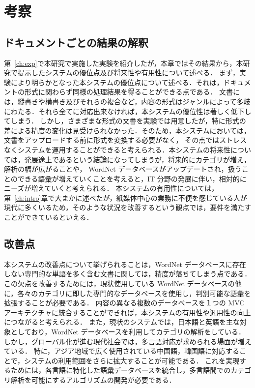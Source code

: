 \chapter{考察}
\label{ch:eval}

\quad

\section{ドキュメントごとの結果の解釈}
\label{sec:eval_docs}

第~\ref{ch:exp}で本研究で実施した実験を紹介したが，本章ではその結果から，本研究で提示したシステムの優位点及び将来性や有用性について述べる．
まず，実験により明らかとなった本システムの優位点について述べる．それは，ドキュメントの形式に関わらず同様の処理結果を得ることができる点である．
文書には，縦書きや横書き及びそれらの複合など，内容の形式はジャンルによって多岐にわたる．それら全てに対応出来なければ，本システムの優位性は著しく低下してしまう．
しかし，さまざまな形式の文書を実験では用意したが，特に形式の差による精度の変化は見受けられなかった．そのため，本システムにおいては，文書をアップロードする前に形式を変換する必要がなく，
その点ではストレスなくシステムを運用することができると考えられる．本システムの将来性については，発展途上であるという結論になってしまうが，将来的にカテゴリが増え，解析の幅が広がることや，
WordNet データベースがアップデートされ，扱うことのできる語彙が増えていくことを考えると，IT 分野の発展に伴い，相対的にニーズが増えていくと考えられる．
本システムの有用性については，第~\ref{ch:intro}章で大まかに述べたが，紙媒体中心の業務に不便を感じている人が現代に多くいるため，そのような状況を改善するという観点では，要件を満たすことができているといえる．

\section{改善点}
\label{sec:eval_improve}
本システムの改善点について挙げられることは，WordNet データベースに存在しない専門的な単語を多く含む文書に関しては，精度が落ちてしまう点である．
この欠点を改善するためには，現状使用している WordNet データべースの他に，各々のカテゴリに即した専門的なデータベースを使用し，判別可能な語彙を拡張することが必要である．
内容の異なる複数のデータベースを１つの MVC アーキテクチャに統合することができれば，本システムの有用性や汎用性の向上につながると考えられる．
また，現状のシステムでは，日本語と英語を主な対象としており，WordNet データベースを利用してカテゴリの解析をしている．しかし，グローバル化が進む現代社会では，多言語対応が求められる場面が増えている．
特に，アジア地域で広く使用されている中国語，韓国語に対応することで，システムの利用範囲をさらに拡大することが可能である．
これを実現するためには，各言語に特化した語彙データベースを統合し，多言語間でのカテゴリ解析を可能にするアルゴリズムの開発が必要である．
